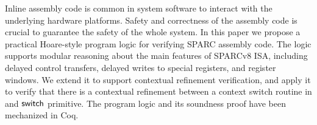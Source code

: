 Inline assembly code is common in system software to interact with
the underlying hardware platforms. Safety and correctness of the
assembly code is crucial to guarantee the safety of the whole
system. In this paper we propose a practical Hoare-style program
logic for verifying SPARC assembly code. The logic supports
modular reasoning about the main features of SPARCv8 ISA, including
delayed control transfers, delayed writes to special registers,
and register windows. We extend it to support contextual refinement 
verification, and apply it to verify that there is a contextual 
refinement between a context switch routine in \sparc{} and 
$\mathsf{switch}{}$ primitive. The program logic and its soundness proof 
have been mechanized in Coq. 

